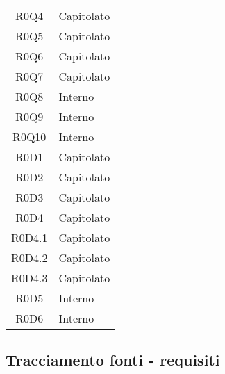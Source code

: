 \begin{center}
\begin{longtable}{ c m{3cm} }
   R0Q4 & Capitolato \\
   R0Q5 & Capitolato \\
   R0Q6 & Capitolato \\
   R0Q7 & Capitolato \\
   R0Q8 & Interno \\
   R0Q9 & Interno \\
   R0Q10 & Interno \\
   R0D1 & Capitolato \\ 
   R0D2 & Capitolato\\ 
   R0D3 & Capitolato\\ 
   R0D4 & Capitolato \\ 
   R0D4.1 & Capitolato \\
   R0D4.2 & Capitolato \\
   R0D4.3 & Capitolato \\
   R0D5 & Interno \\
   R0D6 & Interno \\

    \end{longtable}
    
\end{center}

\subsection{Tracciamento fonti - requisiti}

